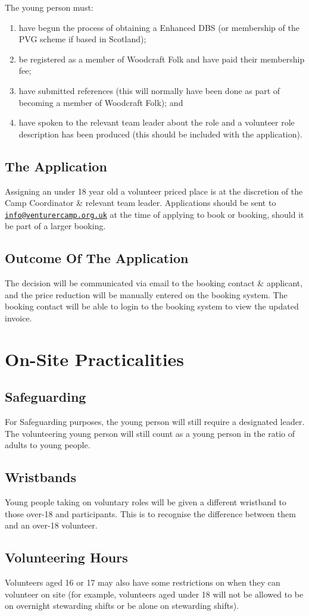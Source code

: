 \documentclass[a4paper, 11pt]{article}
\begin{document}
The young person must: 
\begin{enumerate}
    \item have begun the process of obtaining a Enhanced DBS (or membership of the PVG scheme if based in Scotland);
    \item be registered as a member of Woodcraft Folk and have paid their membership fee;
    \item have submitted references (this will normally have been done as part of becoming a member of Woodcraft Folk); and
    \item have spoken to the relevant team leader about the role and a volunteer role description has been produced (this should be included with the application). 
\end{enumerate}

\subsection{The Application}
Assigning an under 18 year old a volunteer priced place is at the discretion of the Camp Coordinator \& relevant team leader. Applications should be sent to \href{mailto:info@venturercamp.org.uk}{\texttt{info@venturercamp.org.uk}} at the time of applying to book or booking, should it be part of a larger booking.

\subsection{Outcome Of The Application}
The decision will be communicated via email to the booking contact \& applicant, and the price reduction will be manually entered on the booking system. The booking contact will be able to login to the booking system to view the updated invoice. 

\section{On-Site Practicalities}
\subsection{Safeguarding}
For Safeguarding purposes, the young person will still require a designated leader. The volunteering young person will still count as a young person in the ratio of adults to young people.

\subsection{Wristbands}
Young people taking on voluntary roles will be given a different wristband to those over-18 and participants. This is to recognise the difference between them and an over-18 volunteer.

\subsection{Volunteering Hours}
Volunteers aged 16 or 17 may also have some restrictions on when they can volunteer on site (for example, volunteers aged under 18 will not be allowed to be on overnight stewarding shifts or be alone on stewarding shifts). 

\backPage
\end{document}
